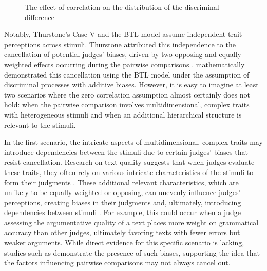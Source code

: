 \documentclass[
  authoryear,
  preprint,
  1p]{elsarticle}
\begin{document}
\begin{figure}


\caption{\label{fig-correlation}The effect of correlation on the
distribution of the discriminal difference}

\end{figure}%

Notably, Thurstone's Case V and the BTL model assume independent trait
perceptions across stimuli. Thurstone attributed this independence to
the cancellation of potential judges' biases, driven by two opposing and
equally weighted effects occurring during the pairwise comparisons
\citep[pp.~268]{Thurstone_1927b}. \citet{Andrich_1978} mathematically
demonstrated this cancellation using the BTL model under the assumption
of discriminal processes with additive biases. However, it is easy to
imagine at least two scenarios where the zero correlation assumption
almost certainly does not hold: when the pairwise comparison involves
multidimensional, complex traits with heterogeneous stimuli and when an
additional hierarchical structure is relevant to the stimuli.

In the first scenario, the intricate aspects of multidimensional,
complex traits may introduce dependencies between the stimuli due to
certain judges' biases that resist cancellation. Research on text
quality suggests that when judges evaluate these traits, they often rely
on various intricate characteristics of the stimuli to form their
judgments
\citep{vanDaal_et_al_2016, Lesterhuis_2018, Chambers_et_al_2022}. These
additional relevant characteristics, which are unlikely to be equally
weighted or opposing, can unevenly influence judges' perceptions,
creating biases in their judgments and, ultimately, introducing
dependencies between stimuli
\citep[pp.~346]{vanderLinden_et_al_2017_II}. For example, this could
occur when a judge assessing the argumentative quality of a text places
more weight on grammatical accuracy than other judges, ultimately
favoring texts with fewer errors but weaker arguments. While direct
evidence for this specific scenario is lacking, studies such as
\citet{Pollitt_et_al_2003} demonstrate the presence of such biases,
supporting the idea that the factors influencing pairwise comparisons
may not always cancel out.
\end{document}
